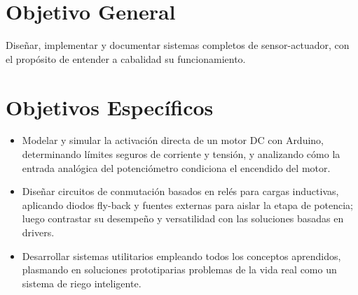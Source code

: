 \section{Objetivo General}

Diseñar, implementar y documentar sistemas completos de sensor-actuador, con el propósito de entender a cabalidad su funcionamiento.

\section{Objetivos Específicos}

\begin{itemize}
    \item Modelar y simular la activación directa de un motor DC con Arduino, determinando límites seguros de corriente y tensión, y analizando cómo la entrada analógica del potenciómetro condiciona el encendido del motor.
    \item Diseñar circuitos de conmutación basados en relés para cargas inductivas, aplicando diodos fly-back y fuentes externas para aislar la etapa de potencia; luego contrastar su desempeño y versatilidad con las soluciones basadas en drivers.
    \item Desarrollar sistemas utilitarios empleando todos los conceptos aprendidos, plasmando en soluciones prototiparias problemas de la vida real como un sistema de riego inteligente.
\end{itemize}